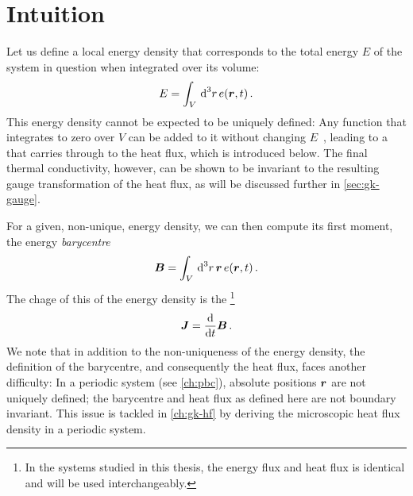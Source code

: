 \section{Intuition}


Let us define a local energy density that corresponds to the total energy $E$ of the system in question when integrated over its volume:
\begin{equation}
    E = \int_{V} \, \text{d}^3r \, e(\boldsymbol{r}, t) \, .
\end{equation}
This energy density cannot be expected to be uniquely defined: Any function that integrates to zero over $V$ can be added to it without changing $E$~\cite{cm1992t}, leading to a  that carries through to the heat flux, which is introduced below. The final thermal conductivity, however, can be shown to be invariant to the resulting gauge transformation of the heat flux, as will be discussed further in \cref{sec:gk-gauge}.

For a given, non-unique, energy density, we can then compute its first moment, the energy \emph{barycentre}
\begin{equation}
    \boldsymbol{B} = \int_{V} \, \text{d}^3r \, \boldsymbol{r}\, e(\boldsymbol{r}, t) \, .
\end{equation}
The chage of this  of the energy density is the \footnote[][\baselineskip]{In the systems studied in this thesis, the energy flux and heat flux is identical and will be used interchangeably.}\begin{equation}
    \boldsymbol{J} = \frac{\text{d}}{\text{d} t} \boldsymbol{B} \, .
\end{equation}
We note that in addition to the non-uniqueness of the energy density, the definition of the barycentre, and consequently the heat flux, faces another difficulty: In a periodic system (see \cref{ch:pbc}), absolute positions $\boldsymbol{r}$ are not uniquely defined; the barycentre and heat flux as defined here are not boundary invariant. This issue is tackled in \cref{ch:gk-hf} by deriving the microscopic heat flux density in a periodic system.

